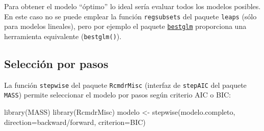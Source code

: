 \documentclass[
]{book}
\newenvironment{Shaded}{\begin{snugshade}}{\end{snugshade}}
\newcommand{\AttributeTok}[1]{\textcolor[rgb]{0.77,0.63,0.00}{#1}}
\newcommand{\FunctionTok}[1]{\textcolor[rgb]{0.00,0.00,0.00}{#1}}
\newcommand{\NormalTok}[1]{#1}
\newcommand{\OtherTok}[1]{\textcolor[rgb]{0.56,0.35,0.01}{#1}}
\newcommand{\StringTok}[1]{\textcolor[rgb]{0.31,0.60,0.02}{#1}}
\theoremstyle{break}
\theoremstyle{nonumberplain}
\begin{document}
Para obtener el modelo ``óptimo'' lo ideal sería evaluar todos los modelos posibles.
En este caso no se puede emplear la función \texttt{regsubsets} del paquete \texttt{leaps} (sólo para modelos lineales),
pero por ejemplo el paquete
\href{https://cran.r-project.org/web/packages/bestglm/vignettes/bestglm.pdf}{\texttt{bestglm}}
proporciona una herramienta equivalente (\texttt{bestglm()}).

\hypertarget{selecciuxf3n-por-pasos-1}{%
\subsection{Selección por pasos}\label{selecciuxf3n-por-pasos-1}}

La función \texttt{stepwise} del paquete \texttt{RcmdrMisc} (interfaz de \texttt{stepAIC} del paquete \texttt{MASS})
permite seleccionar el modelo por pasos según criterio AIC o BIC:

\begin{Shaded}
\begin{Highlighting}[]
\FunctionTok{library}\NormalTok{(MASS)}
\FunctionTok{library}\NormalTok{(RcmdrMisc)}
\NormalTok{modelo }\OtherTok{\textless{}{-}} \FunctionTok{stepwise}\NormalTok{(modelo.completo, }\AttributeTok{direction=}\StringTok{\textquotesingle{}backward/forward\textquotesingle{}}\NormalTok{, }\AttributeTok{criterion=}\StringTok{\textquotesingle{}BIC\textquotesingle{}}\NormalTok{)}
\end{Highlighting}
\end{Shaded}
\end{document}
